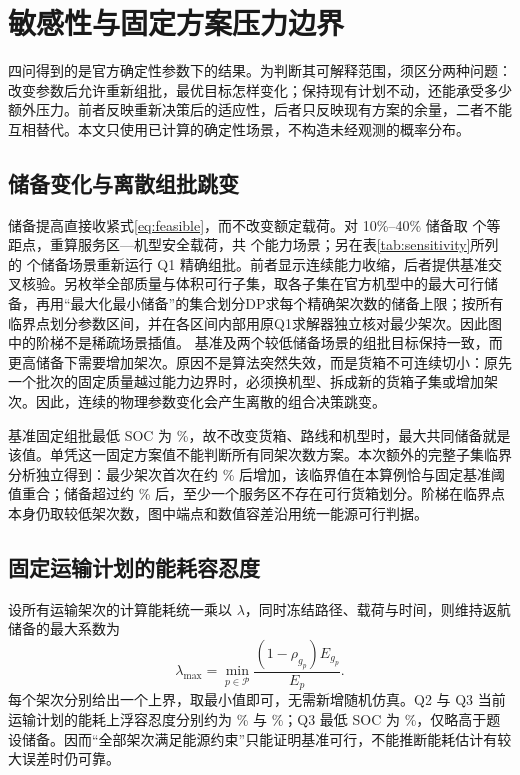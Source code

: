 \section{敏感性与固定方案压力边界}\label{sec:sensitivity}
四问得到的是官方确定性参数下的结果。为判断其可解释范围，须区分两种问题：改变参数后允许重新组批，最优目标怎样变化；保持现有计划不动，还能承受多少额外压力。前者反映重新决策后的适应性，后者只反映现有方案的余量，二者不能互相替代。本文只使用已计算的确定性场景，不构造未经观测的概率分布。

\subsection{储备变化与离散组批跳变}
储备提高直接收紧式\eqref{eq:feasible}，而不改变额定载荷。对 10\%--40\% 储备取 \ReserveGridCount{} 个等距点，重算服务区—机型安全载荷，共 \CapacityCaseCount{} 个能力场景；另在表\ref{tab:sensitivity}所列的 \BatchScenarioCount{} 个储备场景重新运行 Q1 精确组批。前者显示连续能力收缩，后者提供基准交叉核验。另枚举全部质量与体积可行子集，取各子集在官方机型中的最大可行储备，再用“最大化最小储备”的集合划分DP求每个精确架次数的储备上限；按所有临界点划分参数区间，并在各区间内部用原Q1求解器独立核对最少架次。因此图中的阶梯不是稀疏场景插值。
基准及两个较低储备场景的组批目标保持一致，而更高储备下需要增加架次。原因不是算法突然失效，而是货箱不可连续切小：原先一个批次的固定质量越过能力边界时，必须换机型、拆成新的货箱子集或增加架次。因此，连续的物理参数变化会产生离散的组合决策跳变。

基准固定组批最低 SOC 为 \QOneReserveLimit\%，故不改变货箱、路线和机型时，最大共同储备就是该值。单凭这一固定方案值不能判断所有同架次数方案。本次额外的完整子集临界分析独立得到：最少架次首次在约 \ReserveTripBreak\% 后增加，该临界值在本算例恰与固定基准阈值重合；储备超过约 \ReserveReachabilityLimit\% 后，至少一个服务区不存在可行货箱划分。阶梯在临界点本身仍取较低架次数，图中端点和数值容差沿用统一能源可行判据。

\subsection{固定运输计划的能耗容忍度}
设所有运输架次的计算能耗统一乘以 $\lambda$，同时冻结路径、载荷与时间，则维持返航储备的最大系数为
\begin{equation}
\lambda_{\max}=\min_{p\in\mathcal P}
\frac{(1-\rho_{g_p})E_{g_p}}{E_p}.\label{eq:stress}
\end{equation}
每个架次分别给出一个上界，取最小值即可，无需新增随机仿真。Q2 与 Q3 当前运输计划的能耗上浮容忍度分别约为 \QTwoEnergyTolerance\% 与 \QThreeEnergyTolerance\%；Q3 最低 SOC 为 \MinSoc\%，仅略高于题设储备。因而“全部架次满足能源约束”只能证明基准可行，不能推断能耗估计有较大误差时仍可靠。

